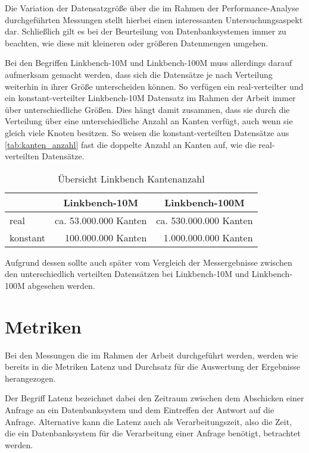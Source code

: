 Die Variation der Datensatzgröße über die im Rahmen der Performance-Analyse durchgeführten Messungen stellt hierbei einen interessanten Untersuchungsaspekt dar. Schließlich gilt es bei der Beurteilung von Datenbanksystemen immer zu beachten, wie diese mit kleineren oder größeren Datenmengen umgehen.

Bei den Begriffen Linkbench-10M und Linkbench-100M muss allerdings darauf aufmerksam gemacht werden, dass sich die Datensätze je nach Verteilung weiterhin in ihrer Größe unterscheiden können. So verfügen ein real-verteilter und ein konstant-verteilter Linkbench-10M Datensatz im Rahmen der Arbeit immer über unterschiedliche Größen. Dies hängt damit zusammen, dass sie durch die Verteilung über eine unterschiedliche Anzahl an Kanten verfügt, auch wenn sie gleich viele Knoten besitzen. So weisen die konstant-verteilten Datensätze aus \autoref{tab:kanten_anzahl} fast die doppelte Anzahl an Kanten auf, wie die real-verteilten Datensätze. 

\begin{table}[ht]
    \centering
    \begin{tabular}{l|r|r}
    \hline
    \rowcolor[HTML]{EFEFEF} 
    \multicolumn{1}{c|}{\cellcolor[HTML]{EFEFEF}\textbf{Verteilung}} & \multicolumn{1}{c|}{\cellcolor[HTML]{EFEFEF}\textbf{Linkbench-10M}} & \multicolumn{1}{c}{\cellcolor[HTML]{EFEFEF}\textbf{Linkbench-100M}} \\ \hline
    real & ca. 53.000.000 Kanten & ca. 530.000.000 Kanten \\
    konstant & 100.000.000 Kanten & 1.000.000.000 Kanten \\ \hline
    \end{tabular}
    \caption{Übersicht Linkbench Kantenanzahl}
    \label{tab:kanten_anzahl}
\end{table}

Aufgrund dessen sollte auch später vom Vergleich der Messergebnisse zwischen den unterschiedlich verteilten Datensätzen bei Linkbench-10M und Linkbench-100M abgesehen werden.

\section{Metriken}
\label{analyse:metriken}
Bei den Messungen die im Rahmen der Arbeit durchgeführt werden, werden wie bereits in \cite{sigmod_tian} die Metriken Latenz und Durchsatz für die Auswertung der Ergebnisse herangezogen. 

Der Begriff Latenz bezeichnet dabei den Zeitraum zwischen dem Abschicken einer Anfrage an ein Datenbanksystem und dem Eintreffen der Antwort auf die Anfrage. Alternative kann die Latenz auch als Verarbeitungszeit, also die Zeit, die ein Datenbanksystem für die Verarbeitung einer Anfrage benötigt, betrachtet werden. 

